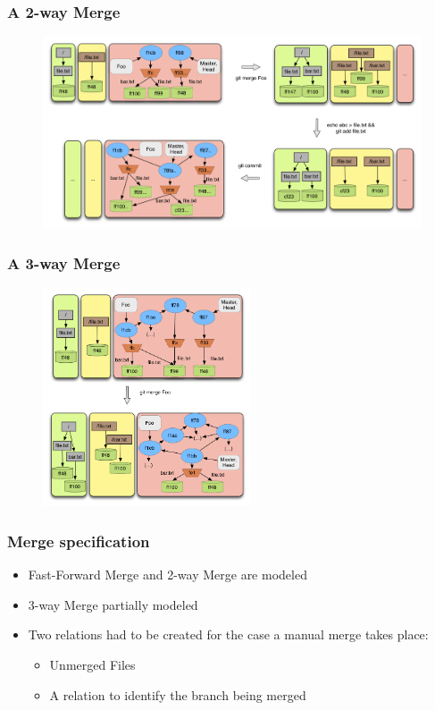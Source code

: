 \documentclass{beamer}
\begin{document}
\begin{frame}[fragile]
   \frametitle{A 2-way Merge}
   \begin{figure}
      \centering
      \includegraphics[width=1.0\textwidth]{images/merge2way.png}
   \end{figure}
\end{frame}

\begin{frame}[fragile]
   \frametitle{A 3-way Merge}
   \begin{figure}
      \centering
      \includegraphics[width=0.55\textwidth]{images/merge3way.png}
   \end{figure}
\end{frame}

\begin{frame}[fragile]
	\frametitle{Merge specification}
   \normalsize
	\begin{itemize}
      \item Fast-Forward Merge and 2-way Merge are modeled
	   \item 3-way Merge partially modeled
	   \item Two relations had to be created for the case a manual
      merge takes place:
	   \begin{itemize}
		   \item Unmerged Files
		   \item A relation to identify the branch being merged
	   \end{itemize}
	\end{itemize}
\end{frame}
\end{document}
